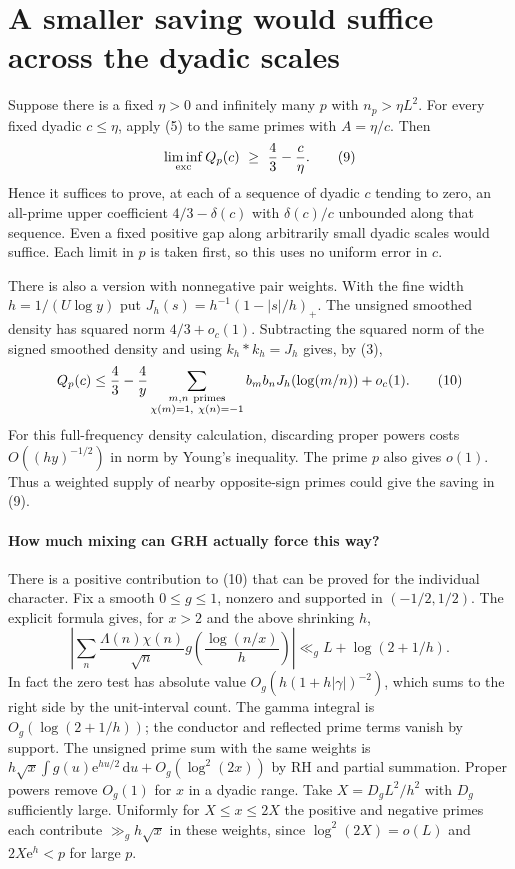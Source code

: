 \documentclass[11pt]{article}
\newcommand{\e}{\mathrm e}
\newcommand{\dd}{\,\mathrm d}
\begin{document}
\section{A smaller saving would suffice across the dyadic scales}
Suppose there is a fixed $\eta>0$ and infinitely many $p$ with
$n_p>\eta L^2$. For every fixed dyadic $c\le\eta$, apply (5) to the
same primes with $A=\eta/c$. Then
\[
 \liminf_{\rm exc} Q_p(c)\ \ge\ \frac43-\frac c\eta.
 \tag{9}
\]
Hence it suffices to prove, at each of a sequence of dyadic $c$ tending
to zero, an all-prime upper coefficient $4/3-\delta(c)$ with
$\delta(c)/c$ unbounded along that sequence. Even a fixed positive
gap along arbitrarily small dyadic scales would suffice. Each
limit in $p$ is taken first, so this uses no uniform error in $c$.

There is also a version with nonnegative pair weights. With the fine
width $h=1/(U\log y)$ put $J_h(s)=h^{-1}(1-|s|/h)_+$. The unsigned
smoothed density has squared norm $4/3+o_c(1)$. Subtracting the
squared norm of the signed smoothed density and using $k_h*k_h=J_h$
gives, by (3),
\[
 Q_p(c)\le\frac43-
  \frac4y\sum_{\substack{m,n\ {\rm primes}\\\chi(m)=1,\ \chi(n)=-1}}
       b_m b_n J_h(\log(m/n))+o_c(1).
 \tag{10}
\]
For this full-frequency density calculation, discarding proper powers
costs $O((hy)^{-1/2})$ in norm by Young's inequality. The prime $p$
also gives $o(1)$. Thus a weighted supply of nearby opposite-sign
primes could give the saving in (9).

\paragraph{How much mixing can GRH actually force this way?}
There is a positive contribution to (10) that can be proved for
the individual character. Fix a smooth $0\le g\le1$, nonzero and
supported in $(-1/2,1/2)$. The explicit formula gives, for $x>2$
and the above shrinking $h$,
\[
 \left|\sum_n\frac{\Lambda(n)\chi(n)}{\sqrt n}
              g\!\left(\frac{\log(n/x)}{h}\right)\right|
 \ll_g L+\log(2+1/h).
 \tag{11}
\]
In fact the zero test has absolute value
$O_g(h(1+h|\gamma|)^{-2})$, which sums to the right side by the
unit-interval count. The gamma integral is $O_g(\log(2+1/h))$;
the conductor and reflected prime terms vanish by support. The
unsigned prime sum with the same weights is
$h\sqrt x\int g(u)\e^{hu/2}\dd u+O_g(\log^2(2x))$ by RH and
partial summation. Proper powers remove $O_g(1)$ for $x$ in a
dyadic range. Take $X=D_g L^2/h^2$ with $D_g$ sufficiently large.
Uniformly for $X\le x\le2X$ the positive and negative primes each
contribute $\gg_g h\sqrt x$ in these weights, since
$\log^2(2X)=o(L)$ and $2X\e^h<p$ for large $p$.
\end{document}
